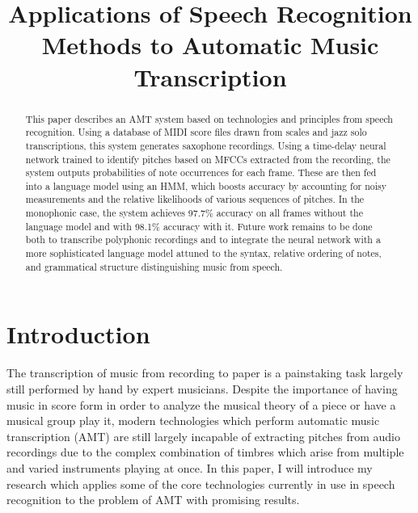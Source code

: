 \documentclass[conference]{IEEEtran}
\begin{document}
\title{Applications of Speech Recognition Methods to Automatic Music Transcription\\
}

\author{
}

\maketitle

\begin{abstract}
This paper describes an AMT system based on technologies and principles from speech recognition. Using a database of MIDI score files drawn from scales and jazz solo transcriptions, this system generates saxophone recordings. Using a time-delay neural network trained to identify pitches based on MFCCs extracted from the recording, the system outputs probabilities of note occurrences for each frame. These are then fed into a language model using an HMM, which boosts accuracy by accounting for noisy measurements and the relative likelihoods of various sequences of pitches. In the monophonic case, the system achieves 97.7\% accuracy on all frames without the language model and with 98.1\% accuracy with it. Future work remains to be done both to transcribe polyphonic recordings and to integrate the neural network with a more sophisticated language model attuned to the syntax, relative ordering of notes, and grammatical structure distinguishing music from speech.
\end{abstract}

\section{Introduction}

The transcription of music from recording to paper is a painstaking task largely still performed by hand by expert musicians. Despite the importance of having music in score form in order to analyze the musical theory of a piece or have a musical group play it, modern technologies which perform automatic music transcription (AMT)  are still largely incapable of extracting pitches from audio recordings due to the complex combination of timbres which arise from multiple and varied instruments playing at once. In this paper, I will introduce my research which applies some of the core technologies currently in use in speech recognition to the problem of AMT with promising results.
\end{document}
